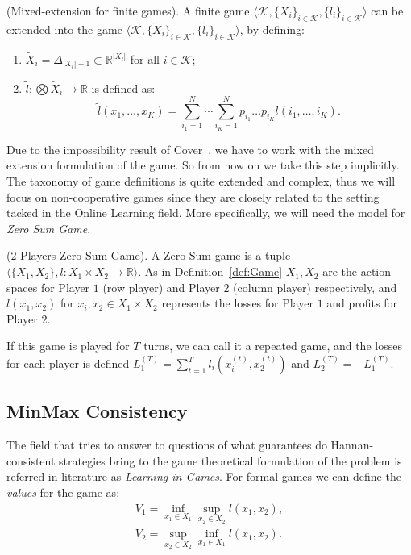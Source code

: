 \begin{definition}(Mixed-extension for finite games).
A finite game $\langle\mathcal K,\{X_i\}_{i\in\mathcal K},\{l_i\}_{i\in\mathcal K}\rangle$ can be extended into the game $\langle\mathcal K,\{\tilde X_i\}_{i\in\mathcal K},\{\tilde l_i\}_{i\in\mathcal K}\rangle$, by defining:
\begin{enumerate}
	\item $\tilde X_i=\Delta_{|X_i|-1}\subset \mathbb R^{|X_i|}$ for all $i\in\mathcal K$;
	\item $\tilde l:\bigotimes \tilde X_i\to\mathbb R$ is defined as:
	$$\tilde l(x_1,\ldots,x_K)=\sum\limits_{i_1=1}^N\cdots\sum\limits_{i_K=1}^Np_{i_1}\ldots p_{i_K}l(i_1,\ldots,i_K).$$ 
\end{enumerate}
\end{definition}

Due to the impossibility result of Cover~\cite{cover1966behavior}, we have to work with the mixed extension formulation of the game. So from now on we take this step implicitly.
The taxonomy of game definitions is quite extended and complex, thus we will focus on non-cooperative games \cite{nash1951non} since they are closely related to the setting tacked in the Online Learning field. More specifically, we will need the model for \emph{Zero Sum Game}. 

\begin{definition}($2$-Players Zero-Sum Game).\label{def:ZSG}
A Zero Sum game is a tuple $\langle\{X_1,X_2\},l:X_1\times X_2\to\mathbb R\rangle$. As in Definition~\ref{def:Game} $X_1,X_2$ are the action spaces for Player $1$ (row player) and Player 2 (column player) respectively, and $l(x_1,x_2)$ for $x_i,x_2\in X_1\times X_2$ represents the losses for Player $1$ and profits for Player $2$.
\end{definition}

If this game is played for $T$ turns, we can call it a repeated game, and the losses for each player is defined $L_1^{(T)}=\sum\limits_{t=1}^Tl_i\left(x_i^{(t)},x_2^{(t)}\right)$ and $L_2^{(T)}=-L_1^{(T)}$. 

\subsection{MinMax Consistency}
The field that tries to answer to questions of what guarantees do Hannan-consistent strategies bring to the game theoretical formulation of the problem is referred in literature as \emph{Learning in Games}.
For formal games we can define the \emph{values} for the game as: 
\begin{align}
    V_1=\inf\limits_{x_1\in X_1}\sup\limits_{x_2\in X_2}l(x_1,x_2),\\
	V_2=\sup\limits_{x_2\in X_2}\inf\limits_{x_1\in X_1}l(x_1,x_2).
\end{align}

